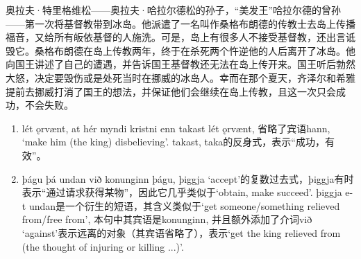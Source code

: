\begin{translation*}{}
    奥拉夫·特里格维松——奥拉夫·哈拉尔德松的孙子，“美发王”哈拉尔德的曾孙——第一次将基督教带到冰岛。他派遣了一名叫作桑格布朗德的传教士去岛上传播福音，又给所有皈依基督的人施洗。可是，岛上有很多人不接受基督教，还出言诋毁它。桑格布朗德在岛上传教两年，终于在杀死两个忤逆他的人后离开了冰岛。他向国王讲述了自己的遭遇，并告诉国王基督教还无法在岛上传开来。国王听后勃然大怒，决定要毁伤或是处死当时在挪威的冰岛人。幸而在那个夏天，齐泽尔和希雅提前去挪威打消了国王的想法，并保证他们会继续在岛上传教，且这一次只会成功，不会失败。
\end{translation*}
\begin{grammar*}{}
    \begin{enumerate}[leftmargin=*]
        \item lét ǫrvænt, at hér myndi kristni enn takast
              lét ǫrvænt, 省略了宾语hann, `make him (the king) disbelieving'. takast, taka的反身式，表示“成功，有效”。
        \item þágu þá undan við konunginn
              þágu, þiggja `accept'的复数过去式，þiggja有时表示“通过请求获得某物”，因此它几乎类似于`obtain, make succeed'. þiggja e-t undan是一个衍生的短语，其含义类似于`get someone/something relieved from/free from', 本句中其宾语是konunginn, 并且额外添加了介词við `against'表示远离的对象（其宾语省略了），表示`get the king relieved from (the thought of injuring or killing ...)'.
    \end{enumerate}
\end{grammar*}
